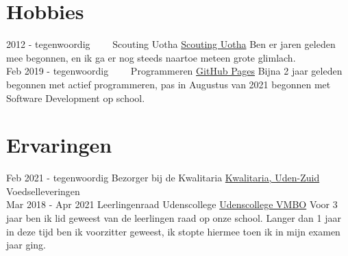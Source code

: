 \documentclass[letterpaper]{twentysecondcv} %
\begin{document}
\section{Hobbies}

\begin{twenty} %
	\twentyitem
    	{2012 -}
        {tegenwoordig~~~~}
        {Scouting Uotha}
        {\href{https://www.uotha.nl/}{Scouting Uotha}}
        {}
            { Ben er jaren geleden mee begonnen, en ik ga er nog steeds naartoe meteen grote glimlach.}\\
	\twentyitem
    	{Feb 2019 -}
        {tegenwoordig~~~~}
        {Programmeren}
        {\href{https://tais993.github.io/}{GitHub Pages}}
        {}
        {Bijna 2 jaar geleden begonnen met actief programmeren, pas in Augustus van 2021 begonnen met Software Development op school.}
\end{twenty}

\vspace{6mm}



\section{Ervaringen}
\begin{twenty} %
	\twentyitem
    		{Feb 2021 -}
		{tegenwoordig}
        		{Bezorger bij de Kwalitaria}
        		{\href{https://kwalitaria.nl/uden-zuid/uden-zuid/}{Kwalitaria, Uden-Zuid}}
        		{}
        		{Voedselleveringen}\\
		\twentyitem
    		{Mar 2018 -}
		{Apr 2021}
        		{Leerlingenraad Udenscollege}
        		{\href{https://www.udenscollege.nl/vmbo/startpagina-vmbo/}{Udenscollege VMBO}}
        		{}
        		{
        		    Voor 3 jaar ben ik lid geweest van de leerlingen raad op onze school.
        		    Langer dan 1 jaar in deze tijd ben ik voorzitter geweest, ik stopte hiermee toen ik in mijn examen jaar ging.
        		}
\end{twenty}
\end{document}
